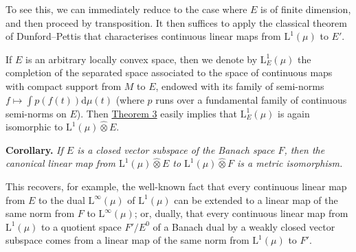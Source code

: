 \documentclass[british]{article}
\newenvironment{itenv}[1]
  {\phantomsection\par\smallskip\noindent\textbf{#1.}\itshape}
  {\par\smallskip}
\newcommand{\oldpage}[1]{\marginpar{\footnotesize$\Big\vert$ \textit{p.~#1}}}
\begin{document}
To see this, we can immediately reduce to the case where \(E\) is of
finite dimension, and then proceed by transposition. It then suffices to
apply the classical theorem of Dunford--Pettis that characterises
continuous linear maps from \(\mathrm{L}^1(\mu)\) to \(E'\).

If \(E\) is an arbitrary locally convex space, then we denote by
\(\mathrm{L}_E^1(\mu)\) the completion of the separated space associated
to the space of continuous maps with compact support from \(M\) to
\(E\), endowed with its family of semi-norms
\(f\mapsto\int p(f(t))\mathrm{d}\mu(t)\) (where \(p\) runs over a
fundamental family of continuous semi-norms on \(E\)). Then
\hyperref[section-1-theorem-3]{Theorem 3} easily implies that
\(\mathrm{L}_E^1(\mu)\) is again isomorphic to
\(\mathrm{L}^1(\mu)\hat{\otimes}E\).

\begin{itenv}{Corollary}
If \(E\) is a closed vector subspace of the Banach space \(F\), then the
canonical linear map from \(\mathrm{L}^1(\mu)\hat{\otimes}E\) to
\(\mathrm{L}^1(\mu)\hat{\otimes}F\) is a metric isomorphism.

\end{itenv}

\oldpage{80}

This recovers, for example, the well-known fact that every continuous
linear map from \(E\) to the dual \(\mathrm{L}^\infty(\mu)\) of
\(\mathrm{L}^1(\mu)\) can be extended to a linear map of the same norm
from \(F\) to \(\mathrm{L}^\infty(\mu)\); or, dually, that every
continuous linear map from \(\mathrm{L}^1(\mu)\) to a quotient space
\(F'/E^0\) of a Banach dual by a weakly closed vector subspace comes
from a linear map of the same norm from \(\mathrm{L}^1(\mu)\) to \(F'\).
\end{document}
